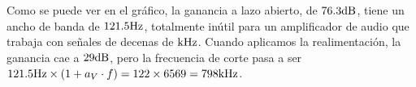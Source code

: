 Como se puede ver en el gráfico, la ganancia a lazo abierto, de $76.3 \si[per-mode=symbol]{\decibel}$, tiene un ancho de banda de $121.5 \si[per-mode=symbol]{\hertz}$, totalmente inútil para un amplificador de audio que trabaja con señales de decenas de $\si[per-mode=symbol]{\kilo\hertz}$. Cuando aplicamos la realimentación, la ganancia cae a $29 \si[per-mode=symbol]{\decibel}$, pero la frecuencia de corte pasa a ser $121.5 \si[per-mode=symbol]{\hertz} \times (1 + a_V \cdot f) = 122 \times 6569 = 798 \si[per-mode=symbol]{\kilo\hertz}$.